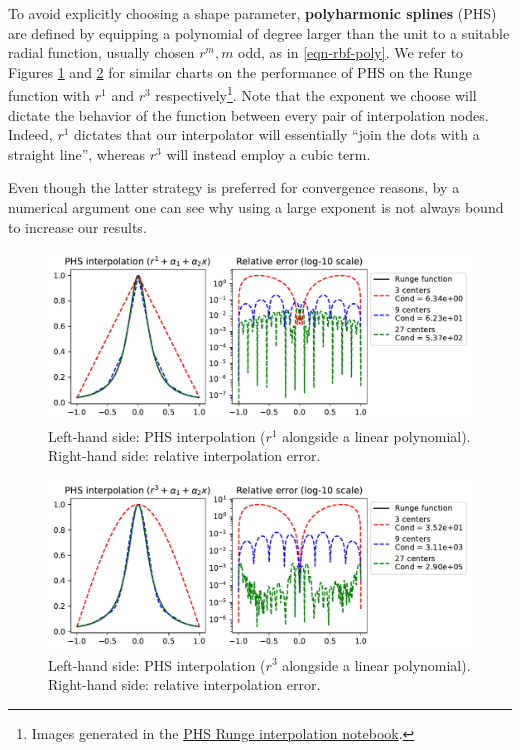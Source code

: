 \documentclass[12pt]{report} %
\begin{document}
To avoid explicitly choosing a shape parameter, \textbf{polyharmonic splines} (PHS) are defined by equipping a polynomial of degree larger than the unit to a suitable radial function, usually chosen $r^m,m$ odd, as in \eqref{eqn-rbf-poly}. We refer to Figures \ref{fig:phs-runge-phenomenon-deg-1-discussion} and \ref{fig:phs-runge-phenomenon-deg-3-discussion} for similar charts on the performance of PHS on the Runge function with $r^1$ and $r^3$ respectively\footnote{Images generated in the \href{https://github.com/heqro/tfm-experiments/blob/main/introductory_notebooks/rbf_interpolation/runge_phs.ipynb}{PHS Runge interpolation notebook}.}. Note that the exponent we choose will dictate the behavior of the function between every pair of interpolation nodes. Indeed, $r^1$ dictates that our interpolator will essentially ``join the dots with a straight line'', whereas $r^3$ will instead employ a cubic term. 

Even though the latter strategy is preferred for convergence reasons, by a numerical argument one can see why using a large exponent is not always bound to increase our results. 

\begin{figure}[ht]
    \centering
    \includegraphics[width=\textwidth]{imagenes/phs_interpolation/runge_phs_r1_deg1.pdf}
    \caption{Left-hand side: PHS interpolation ($r^1$ alongside a linear polynomial). Right-hand side: relative interpolation error.}
    \label{fig:phs-runge-phenomenon-deg-1-discussion}
\end{figure}

\begin{figure}[ht]
    \centering
    \includegraphics[width=\textwidth]{imagenes/phs_interpolation/runge_phs_r3_deg1.pdf}
    \caption{Left-hand side: PHS interpolation ($r^3$ alongside a linear polynomial). Right-hand side: relative interpolation error.}
    \label{fig:phs-runge-phenomenon-deg-3-discussion}
\end{figure}
\end{document}
